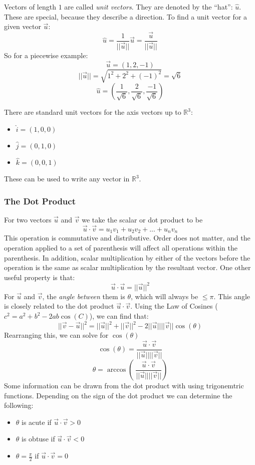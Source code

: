 \documentclass[12pt]{report}
\newcommand{\R}{\mathbb{R}}
\begin{document}
\begin{flushleft}
Vectors of length \(1\) are called \textit{unit vectors}. They are denoted by
the ``hat'': \(\hat{u}\). These are special, because they describe a direction.
To find a unit vector for a given vector \(\vec{u}\):
\[\hat{u} = \frac{1}{||\vec{u}||}\vec{u} = \frac{\vec{u}}{||\vec{u}||}\]
So for a piecewise example:
\[\vec{u} = (1, 2, -1)\]
\[||\vec{u}|| = \sqrt{1^2 + 2^2 + (-1)^2} = \sqrt{6}\]
\[\hat{u} = (\frac{1}{\sqrt{6}}, \frac{2}{\sqrt{6}}, \frac{-1}{\sqrt{6}})\]

\bigskip
There are standard unit vectors for the axis vectors up to \(\R^3\):
\begin{itemize}
    \item \(\hat{i} = (1, 0, 0)\)
    \item \(\hat{j} = (0, 1, 0)\)
    \item \(\hat{k} = (0, 0, 1)\)
\end{itemize}
These can be used to write any vector in \(\R^3\).

\subsubsection*{The Dot Product}
For two vectors \(\vec{u}\) and \(\vec{v}\) we take the scalar or dot product 
to be
\[\vec{u}\cdot\vec{v} = u_1v_1 + u_2v_2 + ... + u_nv_n\]
This operation is commutative and distributive. Order does not matter, and the
operation applied to a set of parenthesis will affect all operations within the
parenthesis. In addition, scalar multiplication by either of the vectors before 
the operation is the same as scalar multiplication by the resultant vector. 
One other useful property is that:
\[\vec{u}\cdot\vec{u} = ||\vec{u}||^2\]
For \(\vec{u}\) and \(\vec{v}\), the \textit{angle between} them is \(\theta\),
which will always be \(\leq\pi\). This angle is closely related to the dot 
product \(\vec{u}\cdot\vec{v}\). Using the Law of Cosines 
(\(c^2 = a^2 + b^2 - 2ab\cos(C)\)), we can find that:
\[||\vec{v} - \vec{u}||^2 = ||\vec{u}||^2 + ||\vec{v}||^2 - 2||\vec{u}||
||\vec{v}||\cos(\theta)\]
Rearranging this, we can solve for \(\cos(\theta)\)
\[\cos(\theta) = \frac{\vec{u}\cdot\vec{v}}{||\vec{u}||||\vec{v}||}\]
\[\theta = \arccos\left(\
\frac{\vec{u}\cdot\vec{v}}{||\vec{u}||||\vec{v}||}\right)\]
Some information can be drawn from the dot product with using trigonemtric
functions. Depending on the sign of the dot product we can determine the 
following:
\begin{itemize}
    \item \(\theta\) is acute if \(\vec{u}\cdot\vec{v} > 0\)
    \item \(\theta\) is obtuse if \(\vec{u}\cdot\vec{v} < 0\)
    \item \(\theta = \frac{\pi}{2}\) if \(\vec{u}\cdot\vec{v} = 0\)
\end{itemize}

\end{flushleft}
\end{document}
